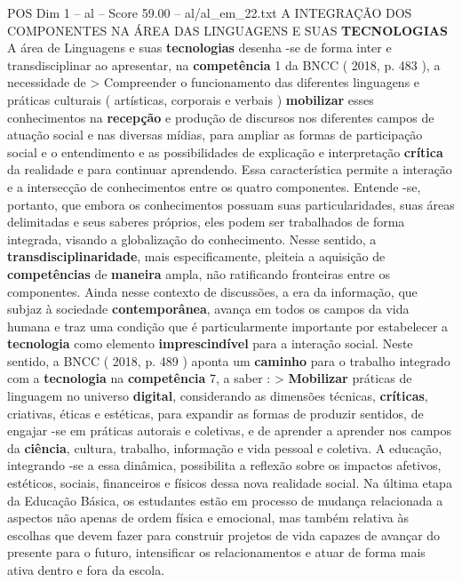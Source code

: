 \begin{textsample}{POS Dim 1 – al – Score 59.00 – al/al\_em\_22.txt}  \label{ex:f1_pos_151}
A INTEGRAÇÃO DOS COMPONENTES NA ÁREA DAS LINGUAGENS E SUAS \textbf{TECNOLOGIAS} A área de Linguagens e suas \textbf{tecnologias} desenha -se de forma inter e transdisciplinar ao apresentar, na \textbf{competência} 1 da BNCC ( 2018, p. 483 ), a necessidade de > Compreender o funcionamento das diferentes linguagens e práticas culturais ( artísticas, corporais e verbais ) \textbf{mobilizar} esses conhecimentos na \textbf{recepção} e produção de discursos nos diferentes campos de atuação social e nas diversas mídias, para ampliar as formas de participação social e o entendimento e as possibilidades de explicação e interpretação \textbf{crítica} da realidade e para continuar aprendendo.
Essa característica permite a interação e a intersecção de conhecimentos entre os quatro componentes.
Entende -se, portanto, que embora os conhecimentos possuam suas particularidades, suas áreas delimitadas e seus saberes próprios, eles podem ser trabalhados de forma integrada, visando a globalização do conhecimento.
Nesse sentido, a \textbf{transdisciplinaridade}, mais especificamente, pleiteia a aquisição de \textbf{competências} de \textbf{maneira} ampla, não ratificando fronteiras entre os componentes.
Ainda nesse contexto de discussões, a era da informação, que subjaz à sociedade \textbf{contemporânea}, avança em todos os campos da vida humana e traz uma condição que é particularmente importante por estabelecer a \textbf{tecnologia} como elemento \textbf{imprescindível} para a interação social.
Neste sentido, a BNCC ( 2018, p. 489 ) aponta um \textbf{caminho} para o trabalho integrado com a \textbf{tecnologia} na \textbf{competência} 7, a saber : > \textbf{Mobilizar} práticas de linguagem no universo \textbf{digital}, considerando as dimensões técnicas, \textbf{críticas}, criativas, éticas e estéticas, para expandir as formas de produzir sentidos, de engajar -se em práticas autorais e coletivas, e de aprender a aprender nos campos da \textbf{ciência}, cultura, trabalho, informação e vida pessoal e coletiva.
A educação, integrando -se a essa dinâmica, possibilita a reflexão sobre os impactos afetivos, estéticos, sociais, financeiros e físicos dessa nova realidade social.
Na última etapa da Educação Básica, os estudantes estão em processo de mudança relacionada a aspectos não apenas de ordem física e emocional, mas também relativa às escolhas que devem fazer para construir projetos de vida capazes de avançar do presente para o futuro, intensificar os relacionamentos e atuar de forma mais ativa dentro e fora da escola.

\end{textsample}
